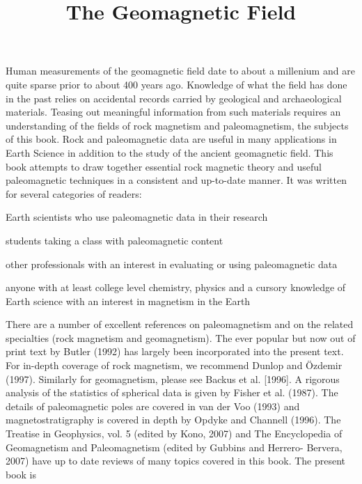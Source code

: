 \documentclass[draft,plain]{tauxe}
\begin{document}
Human measurements of the geomagnetic field date to about a millenium and are
quite sparse prior to about 400 years ago. Knowledge of what the field has done in the past relies
on accidental records carried by geological and archaeological materials. Teasing out meaningful
information from such materials requires an understanding of the fields of rock magnetism and paleomagnetism,
the subjects of this book. Rock and paleomagnetic data are useful in many applications
in Earth Science in addition to the study of the ancient geomagnetic field. This book attempts
to draw together essential rock magnetic theory and useful paleomagnetic techniques in a consistent
and up-to-date manner. It was written for several categories of readers:
\begin{bulletlist}
\item Earth scientists who use paleomagnetic data in their research
\item students taking a class with paleomagnetic content
\item other professionals with an interest in evaluating or using paleomagnetic data
\item anyone with at least college level chemistry, physics and a cursory knowledge of Earth
science with an interest in magnetism in the Earth
\end{bulletlist}

There are a number of excellent references on paleomagnetism and on the related specialties
(rock magnetism and geomagnetism). The ever popular but now out of print text by Butler (1992)
has largely been incorporated into the present text. For in-depth coverage of rock magnetism, we
recommend Dunlop and \"{O}zdemir (1997). Similarly for geomagnetism, please see Backus et al.
[1996]. A rigorous analysis of the statistics of spherical data is given by Fisher et al. (1987). The de\-tails
of paleomagnetic poles are covered in van der Voo (1993) and magnetostratigraphy is covered
in depth by Opdyke and Channell (1996). The Treatise in Geophysics, vol. 5 (edited by Kono, 2007)
and The Encyclopedia of Geomagnetism and Paleomagnetism (edited by Gubbins and Herrero-
Bervera, 2007) have up to date reviews of many topics covered in this book. The present book is\vspace*{-12pt}\break

\mainmatter

\setcounter{chapter}{1}

\title{The Geomagnetic Field}
\end{document}
